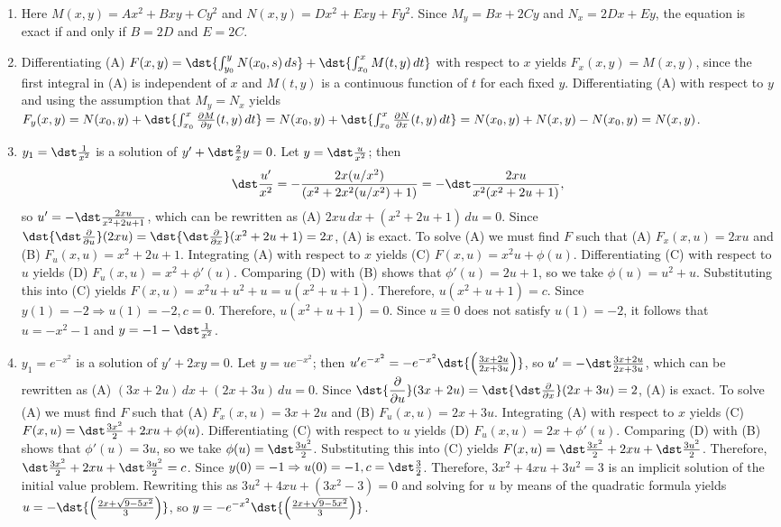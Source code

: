 \documentclass[openany]{book}
\newenvironment{sectionSolutions}{
 \begin{enumerate}[item-label={\thesection.\arabic{enumi}.}]
}{
 \end{enumerate}
}
\begin{document}
\begin{sectionSolutions}
\item
Here $M(x,y)=Ax^2+Bxy+Cy^2$ and
$N(x,y)=Dx^2+Exy+Fy^2$. Since $M_y=Bx+2Cy$ and $N_x=2Dx+Ey$, the
equation is exact if and only if $B=2D$ and $E=2C$.


\item
Differentiating (A)
$F(x,y)=\dst{\int^y_{y_0}N(x_0,s)\,ds}+\dst{\int^x_{x_0}M(t,y)\,dt}$
with respect to $x$ yields $F_x(x,y)=M(x,y)$, since the first
integral
in (A) is independent of $x$ and $M(t,y)$ is a continuous function
of
$t$ for each fixed $y$. Differentiating  (A)  with respect to $y$
and using the assumption that $M_y=N_x$ yields
$F_y(x,y)=N(x_0,y)+\dst{\int^x_{x_0}\frac{\partial M
}{\partial y}(t,y)\,dt}
=N(x_0,y)+\dst{\int^x_{x_0}\frac{\partial N
}{\partial x} (t,y)\,dt}
=N(x_0,y)+N(x,y)-N(x_0,y)=N(x,y)$.


\item
$y_1=\dst\frac{1}{ x^2}$ is a solution of $y'+\dst\frac{2}{ x}y=0$.
Let $y=\dst\frac{u}{ x^2}$; then
\[
\dst\frac{u'}{ x^2}=-\dfrac{2x(u/x^2)}{
\left(x^2+2x^2(u/x^2)+1\right)}=
-\dst\frac{2xu}{ x^2(x^2+2u+1)},
\]
so  $u'=-\dst\frac{2xu}{ x^2+2u+1}$, which can be rewritten as (A)
$2xu\,dx+(x^2+2u+1)\,du=0$. Since $\dst{\dst\frac{\partial }{\partial
u}}(2xu)=\dst{\dst\frac{\partial }{\partial x}}(x^2+2u+1)=2x$, (A)
is exact. To solve (A)
we must find $F$ such that
(A) $F_x(x,u)=2xu$ and
(B) $F_u(x,u)=x^2+2u+1$.
Integrating (A) with respect to $x$ yields
(C) $F(x,u)=x^2u+\phi(u)$.
Differentiating (C) with respect to $u$  yields
(D) $F_u(x,u)=x^2+\phi'(u)$.
Comparing (D) with (B)  shows that
$\phi'(u)=2u+1$, so we take
$\phi(u)=u^2+u$.
Substituting this into (C) yields
$F(x,u)=x^2u+u^2+u=u(x^2+u+1)$.
Therefore, $u(x^2+u+1)=c$.
Since $y(1)=-2\Rightarrow u(1)=-2,
c=0$. Therefore,  $u(x^2+u+1)=0$. Since $u\equiv0$ does not satisfy
$u(1)=-2$, it follows that $u=-x^2-1$ and $y=-1-\dst\frac{1}{ x^2}$.


\item
$y_1=e^{-x^2}$ is a solution of $y'+2xy=0$.
Let $y=ue^{-x^2}$; then
$u'e^{-x^2}=-e^{-x^2}\dst{\left(\frac{3x+2u}{ 2x+3u}\right)}$,
so  $u'=-\dst\frac{3x+2u}{2x+3u}$, which can be rewritten as (A)
$(3x+2u)\,dx+(2x+3u)\,du=0$. Since $\dst{\dfrac{\partial
}{\partial
u}}(3x+2u)=\dst{\dst\frac{\partial }{\partial x}}(2x+3u)=2$, (A)
is exact. To solve (A)
we must find $F$ such that
(A) $F_x(x,u)=3x+2u$ and
(B) $F_u(x,u)=2x+3u$.
Integrating (A) with respect to $x$ yields
(C) $F(x,u)=\dst\frac{3x^2}{2}+2xu+\phi(u)$.
Differentiating (C) with respect to $u$  yields
(D) $F_u(x,u)=2x+\phi'(u)$.
Comparing (D) with (B)  shows that
$\phi'(u)=3u$, so we take
$\phi(u)=\dst\frac{3u^2}{2}$.
Substituting this into (C) yields
$F(x,u)=\dst\frac{3x^2}{2}+2xu+\dst\frac{3u^2}{2}$.
Therefore, $\dst\frac{3x^2}{2}+2xu+\dst\frac{3u^2}{2}=c$.
Since $y(0)=-1\Rightarrow u(0)=-1,
c=\dst\frac{3}{2}$. Therefore,  $3x^2+4xu+3u^2=3$
is an implicit solution of the initial value problem.
Rewriting this as $3u^2+4xu+(3x^2-3)=0$ and
 solving  for $u$ by means of the quadratic formula
yields $u=-\dst{\left(\frac{2x+\sqrt{9-5x^2}}{3}\right)}$, so
 $y=-e^{-x^2}\dst{\left(\frac{2x+\sqrt{9-5x^2}}{3}\right)}$.



\end{sectionSolutions}
\end{document}
